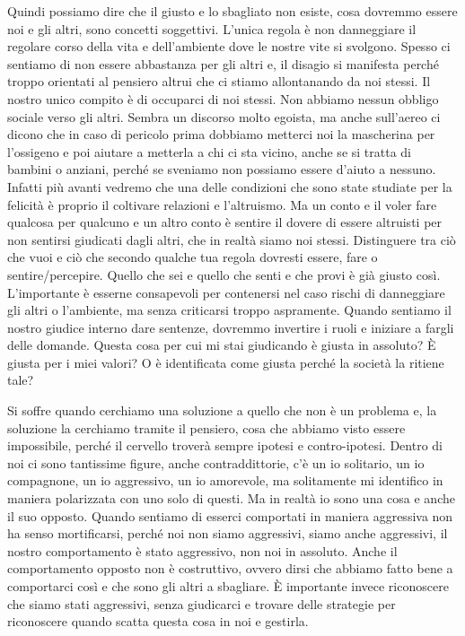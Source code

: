 \documentclass[12pt]{book} %
\begin{document}
Quindi possiamo dire che il giusto e lo sbagliato non esiste, cosa dovremmo essere noi e gli altri, sono concetti
soggettivi. L'unica regola è non danneggiare il regolare corso della vita e
dell'ambiente dove le nostre vite si svolgono. Spesso ci sentiamo di non essere abbastanza per gli
altri e, il disagio si manifesta perché troppo orientati al pensiero altrui che ci stiamo allontanando da noi stessi.
Il nostro unico compito è di occuparci di noi stessi. Non abbiamo nessun obbligo sociale verso gli altri. Sembra un
discorso molto egoista, ma anche sull'aereo ci dicono che in caso di pericolo prima dobbiamo
metterci noi la mascherina per l'ossigeno e poi aiutare a metterla a chi ci sta vicino, anche se
si tratta di bambini o anziani, perché se sveniamo non possiamo essere d'aiuto a nessuno. Infatti
più avanti vedremo che una delle condizioni che sono state studiate per la felicità è proprio il coltivare relazioni e
l'altruismo. Ma un conto e il voler fare qualcosa per qualcuno e un altro conto è sentire il
dovere di essere altruisti per non sentirsi giudicati dagli altri, che in realtà siamo noi stessi. Distinguere tra ciò
che vuoi e ciò che secondo qualche tua regola dovresti essere, fare o sentire/percepire. Quello che sei e quello che
senti e che provi è già giusto così. L'importante è esserne consapevoli per contenersi nel caso
rischi di danneggiare gli altri o l'ambiente, ma senza criticarsi troppo aspramente. Quando
sentiamo il nostro giudice interno dare sentenze, dovremmo invertire i ruoli e iniziare a fargli delle domande. Questa
cosa per cui mi stai giudicando è giusta in assoluto? È giusta per i miei valori? O è identificata come giusta perché
la società la ritiene tale?

Si soffre quando cerchiamo una soluzione a quello che non è un problema e, la soluzione la cerchiamo tramite il
pensiero, cosa che abbiamo visto essere impossibile, perché il cervello troverà sempre ipotesi e contro-ipotesi. Dentro
di noi ci sono tantissime figure, anche contraddittorie, c'è un io solitario, un io compagnone, un io aggressivo, un io
amorevole, ma solitamente mi identifico in maniera polarizzata con uno solo di questi. Ma in realtà io sono una cosa e
anche il suo opposto. Quando sentiamo di esserci comportati in maniera aggressiva non ha senso mortificarsi, perché noi
non siamo aggressivi, siamo anche aggressivi, il nostro comportamento è stato aggressivo, non noi in assoluto. Anche il
comportamento opposto non è costruttivo, ovvero dirsi che abbiamo fatto bene a comportarci così e che sono gli altri a
sbagliare. È importante invece riconoscere che siamo stati aggressivi, senza giudicarci e trovare delle strategie per
riconoscere quando scatta questa cosa in noi e gestirla. 
\end{document}
